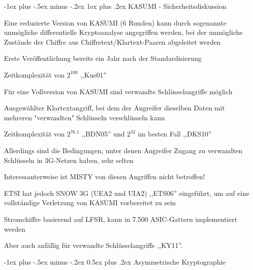 \documentclass[a4paper]{article}
\makeatletter
\renewcommand{\section}{\@startsection{section}{1}{0mm}%
 {-1ex plus -.5ex minus -.2ex}%
 {0.5ex plus .2ex}%
 {\normalfont\large\bfseries}}
\renewcommand{\subsubsection}{\@startsection{subsubsection}{3}{0mm}%
 {-1ex plus -.5ex minus -.2ex}%
 {1ex plus .2ex}%
 {\normalfont\small\bfseries}}
\makeatother
\begin{document}
\begin{multicols}{3}
      \subsubsection{KASUMI - Sicherheitsdiskussion}
      \begin{itemize*}
            \item Eine reduzierte Version von KASUMI (6 Runden) kann durch sogenannte unmögliche differentielle Kryptoanalyse angegriffen werden, bei der unmögliche Zustände der Chiffre aus Chiffretext/Klartext-Paaren abgeleitet werden
            \begin{itemize*}
                  \item Erste Veröffentlichung bereits ein Jahr nach der Standardisierung
                  \item Zeitkomplexität von $2^{100}$ ,,Kue01''
            \end{itemize*}
            \item Für eine Vollversion von KASUMI sind verwandte Schlüsselangriffe möglich
            \begin{itemize*}
                  \item Ausgewählter Klartextangriff, bei dem der Angreifer dieselben Daten mit mehreren "verwandten" Schlüsseln verschlüsseln kann
                  \item Zeitkomplexität von $2^{76.1}$ ,,BDN05'' und $2^{32}$ im besten Fall ,,DKS10''
                  \item Allerdings sind die Bedingungen, unter denen Angreifer Zugang zu verwandten Schlüsseln in 3G-Netzen haben, sehr selten
                  \item Interessanterweise ist MISTY von diesen Angriffen nicht betroffen!
            \end{itemize*}
            \item ETSI hat jedoch SNOW 3G (UEA2 und UIA2) ,,ETS06'' eingeführt, um auf
            eine vollständige Verletzung von KASUMI vorbereitet zu sein
            \begin{itemize*}
                  \item Stromchiffre basierend auf LFSR, kann in 7.500 ASIC-Gattern implementiert werden
                  \item Aber auch anfällig für verwandte Schlüsselangriffe ,,KY11''.
            \end{itemize*}
      \end{itemize*}

      \section{Asymmetrische Kryptographie}


\end{multicols}
\end{document}
